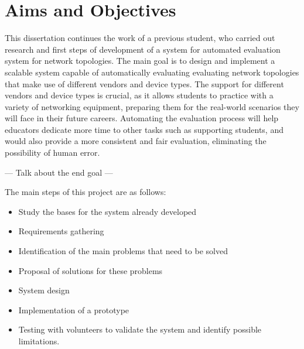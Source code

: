 \section{Aims and Objectives}
This dissertation continues the work of a previous student, who carried out research and first steps of development of a 
system for automated evaluation system for network topologies. The main goal is to design and implement a scalable system 
capable of automatically evaluating evaluating network topologies that make use of different vendors and device types.
The support for different vendors and device types is crucial, as it allows students to practice with a variety of
networking equipment, preparing them for the real-world scenarios they will face in their future careers.
Automating the evaluation process will help educators dedicate more time to other tasks such as supporting students, and
would also provide a more consistent and fair evaluation, eliminating the possibility of human error.

--- Talk about the end goal ---

The main steps of this project are as follows:

\begin{itemize}
    \item Study the bases for the system already developed
    \item Requirements gathering
    \item Identification of the main problems that need to be solved
    \item Proposal of solutions for these problems
    \item System design
    \item Implementation of a prototype
    \item Testing with volunteers to validate the system and identify possible limitations.
  \end{itemize}
